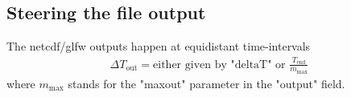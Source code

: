 %



\subsection{Steering the file output} \label{sec:output}
The netcdf/glfw outputs happen at equidistant time-intervals
\begin{align}
    \Delta T_\text{out} = \text{either given by "deltaT" or } \frac{T_{\text{end}}}{m_{\max}}
\end{align}
where $m_{\max}$ stands for the "maxout" parameter in the "output" field.

